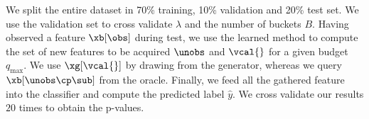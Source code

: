 \documentclass[letterpaper]{article}
\begin{document}
 We split the entire dataset in 70\% training, 10\% validation and 20\% test set. We use the validation set to cross validate $\lambda$ and the number of buckets $B$. Having observed a feature $\xb[\obs]$ during test, we use the learned method to compute the set of new features to be acquired $\unobs$ and $\vcal{}$ for a given budget $q_{\max}$. We use $\xg[\vcal{}]$
by drawing from the generator, whereas we query $\xb[\unobs\cp \sub]$ from the oracle. Finally, we feed all the gathered feature into the classifier and compute the predicted label $\hat{y}$. We cross validate our results $20$ times to obtain the p-values.






\end{document}
